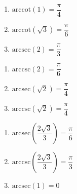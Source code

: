 \begin{multicols}{3} 

\begin{enumerate}

\setcounter{enumi}{\value{HW}}

\item $\mbox{arccot} \left( 1 \right) = \dfrac{\pi}{4}$
\item $\mbox{arccot} \left( \sqrt{3} \right) = \dfrac{\pi}{6}$
\item $\mbox{arcsec} \left( 2 \right) = \dfrac{\pi}{3}$

\setcounter{HW}{\value{enumi}}

\end{enumerate}

\end{multicols}

\begin{multicols}{3} 

\begin{enumerate}

\setcounter{enumi}{\value{HW}}

\item $\mbox{arccsc} \left( 2 \right) = \dfrac{\pi}{6}$
\item $\mbox{arcsec} \left( \sqrt{2} \right) = \dfrac{\pi}{4}$
\item $\mbox{arccsc} \left( \sqrt{2} \right) = \dfrac{\pi}{4}$

\setcounter{HW}{\value{enumi}}

\end{enumerate}

\end{multicols}

\begin{multicols}{3} 

\begin{enumerate}

\setcounter{enumi}{\value{HW}}

\item $\mbox{arcsec} \left( \dfrac{2\sqrt{3}}{3} \right) = \dfrac{\pi}{6}$
\item $\mbox{arccsc} \left( \dfrac{2\sqrt{3}}{3} \right) = \dfrac{\pi}{3}$
\item $\mbox{arcsec} \left( 1 \right) = 0$ 

\setcounter{HW}{\value{enumi}}

\end{enumerate}

\end{multicols}

